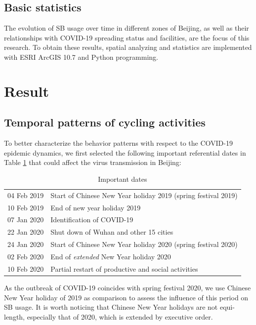 \documentclass[preprints,ijgi,submit,moreauthors]{Definitions/mdpi}
\begin{document}
\subsection{Basic statistics}
The evolution of SB usage over time in different zones of Beijing, as well as their relationships with COVID-19 spreading status and facilities, are the focus of this research.
To obtain these results, spatial analyzing and statistics are implemented with ESRI ArcGIS 10.7 and Python programming. 

\section{Result}

\subsection{Temporal patterns of cycling activities}
To better characterize the behavior patterns with respect to the COVID-19 epidemic dynamics, we first selected the following important referential dates in Table \ref{tab:important_dates} that could affect the virus transmission in Beijing: 

\begin{table}[ht]
    \centering
    \begin{tabular}{ll}
    04 Feb 2019 & Start of Chinese New Year holiday 2019 (spring festival 2019) \\
    10 Feb 2019 & End of new year holiday 2019\\
    07 Jan 2020 & Identification of COVID-19\\
    22 Jan 2020 & Shut down of Wuhan and other 15 cities\\
    24 Jan 2020 & Start of Chinese New Year holiday 2020 (spring festival 2020)\\
    02 Feb 2020 & End of \textit{extended} New Year holiday 2020\\
    10 Feb 2020 & Partial restart of productive and social activities
    \end{tabular}
    \caption{Important dates}
    \label{tab:important_dates}
\end{table}

As the outbreak of COVID-19 coincides with spring festival 2020, we use Chinese New Year holiday of 2019 as comparison to assess the influence of this period on SB usage.
It is worth noticing that Chinese New Year holidays are not equi-length, especially that of 2020, which is extended by executive order.
\end{document}
